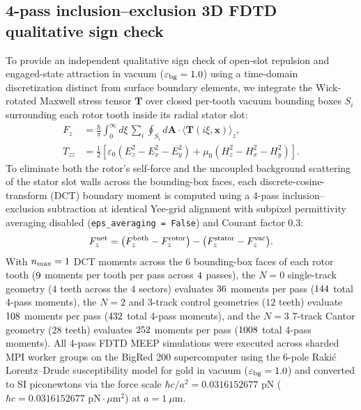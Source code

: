 \documentclass[pdflatex,sn-nature]{sn-jnl}
\begin{document}
\subsection*{4-pass inclusion--exclusion 3D FDTD qualitative sign check}
To provide an independent qualitative sign check of open-slot repulsion and engaged-state attraction in vacuum ($\varepsilon_{\rm bg}=1.0$) using a time-domain discretization distinct from surface boundary elements, we integrate the Wick-rotated Maxwell stress tensor $\mathbf{T}$ over closed per-tooth vacuum bounding boxes $S_i$ surrounding each rotor tooth inside its radial stator slot\cite{rodriguez2009pra,oskooi2010,rodriguez2011}:
\begin{equation}
\begin{aligned}
F_z &= \frac{\hbar}{\pi} \int_0^\infty d\xi \, \sum_{i} \oint_{S_i} d\mathbf{A} \cdot \langle \mathbf{T}(i\xi, \mathbf{x}) \rangle_z, \\
T_{zz} &= \frac{1}{2} \left[ \varepsilon_0 (E_z^2 - E_x^2 - E_y^2) + \mu_0 (H_z^2 - H_x^2 - H_y^2) \right].
\end{aligned}
\label{eq:methods_fdtd}
\end{equation}
To eliminate both the rotor's self-force and the uncoupled background scattering of the stator slot walls across the bounding-box faces, each discrete-cosine-transform (DCT) boundary moment is computed using a 4-pass inclusion--exclusion subtraction at identical Yee-grid alignment with subpixel permittivity averaging disabled (\texttt{eps\_averaging = False}) and Courant factor $0.3$:
\begin{equation}
F_z^{\rm net} = \bigl(F_z^{\rm both} - F_z^{\rm rotor}\bigr) - \bigl(F_z^{\rm stator} - F_z^{\rm vac}\bigr).
\label{eq:methods_four_pass}
\end{equation}
With $n_{\rm max}=1$ DCT moments across the $6$ bounding-box faces of each rotor tooth ($9{}$ moments per tooth per pass across $4{}$ passes), the $N=0$ single-track geometry ($4$ teeth across the $4$ sectors) evaluates $36{}$ moments per pass ($144{}$ total 4-pass moments), the $N=2$ and 3-track control geometries ($12$ teeth) evaluate $108{}$ moments per pass ($432{}$ total 4-pass moments), and the $N=3$ 7-track Cantor geometry ($28$ teeth) evaluates $252{}$ moments per pass ($1008{}$ total 4-pass moments). All 4-pass FDTD MEEP simulations were executed across sharded MPI worker groups on the BigRed 200 supercomputer using the 6-pole Raki\'c Lorentz--Drude susceptibility model for gold\cite{rakic1998} in vacuum ($\varepsilon_{\rm bg}=1.0$) and converted to SI piconewtons via the force scale $\hbar c / a^2 = 0.0316152677\text{ pN}$ ($\hbar c = 0.0316152677\text{ pN}\cdot\mu\text{m}^2$) at $a = 1\ \mu\text{m}$.
\end{document}
